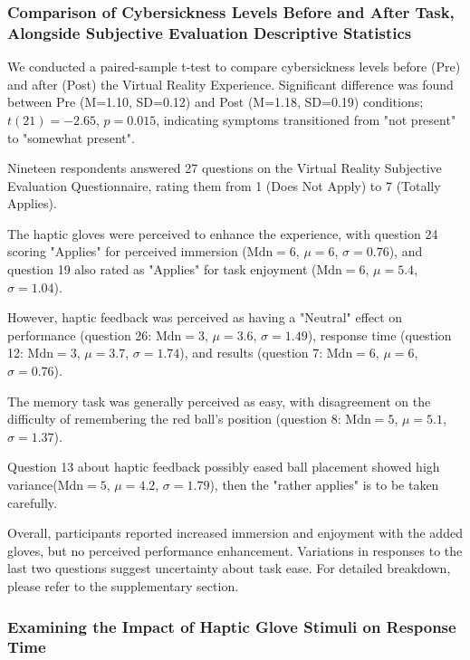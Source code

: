 \documentclass[12pt,oneside,openright]{report}
\begin{document}
\subsubsection*{Comparison of Cybersickness Levels Before and After Task, Alongside Subjective Evaluation Descriptive Statistics}

We conducted a paired-sample t-test to compare cybersickness levels before (Pre) and after (Post) the Virtual Reality Experience. Significant difference was found between Pre (M=1.10, SD=0.12) and Post (M=1.18, SD=0.19) conditions; $t(21)=-2.65$, $p = 0.015$, indicating symptoms transitioned from "not present" to "somewhat present".

Nineteen respondents answered 27 questions on the Virtual Reality Subjective Evaluation Questionnaire, rating them from 1 (Does Not Apply) to 7 (Totally Applies).

The haptic gloves were perceived to enhance the experience, with question 24 scoring "Applies" for perceived immersion ($\text{Mdn} = 6$, $\mu = 6$, $\sigma = 0.76$), and question 19 also rated as "Applies" for task enjoyment ($\text{Mdn} = 6$, $\mu = 5.4$, $\sigma = 1.04$).

However, haptic feedback was perceived as having a "Neutral" effect on performance (question 26: $\text{Mdn} = 3$, $\mu = 3.6$, $\sigma = 1.49$), response time (question 12: $\text{Mdn} = 3$, $\mu = 3.7$, $\sigma = 1.74$), and results (question 7: $\text{Mdn} = 6$, $\mu = 6$, $\sigma = 0.76$).

The memory task was generally perceived as easy, with disagreement on the difficulty of remembering the red ball's position (question 8: $\text{Mdn} = 5$, $\mu = 5.1$, $\sigma = 1.37$).

Question 13 about haptic feedback possibly eased ball placement showed high variance($\text{Mdn} = 5$, $\mu = 4.2$, $\sigma = 1.79$), then the "rather applies" is to be taken carefully.

Overall, participants reported increased immersion and enjoyment with the added gloves, but no perceived performance enhancement. Variations in responses to the last two questions suggest uncertainty about task ease. For detailed breakdown, please refer to the supplementary section.

\subsubsection*{Examining the Impact of Haptic Glove Stimuli on Response Time}
\end{document}
